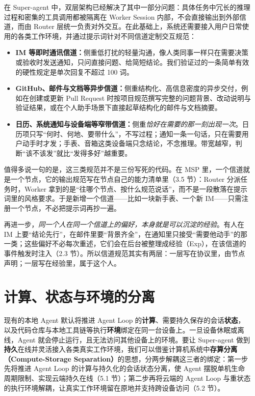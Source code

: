 \documentclass[11pt,a4paper,UTF8,fontset=windows]{ctexart}
\begin{document}
在 Super-agent 中，双层架构已经解决了其中一部分问题：具体任务中冗长的推理过程和密集的工具调用都被隔离在 Worker Session 内部，不会直接输出到外部信道，而由 Router 层统一负责对外交互。在此基础上，系统还需要接入用户日常使用的各类工作环境，并通过提示词针对不同信道定制交互规范：

\begin{itemize}
  \item \textbf{IM 等即时通讯信道：}侧重低打扰的轻量沟通，像人类同事一样只在需要决策或验收时发送通知，只问直接问题、给简短结论。我们验证过的一条简单有效的硬性规定是单次回复不超过 100 词。
  \item \textbf{GitHub、邮件与文档等异步信道：}侧重结构化、高信息密度的异步交付，例如在创建或更新 Pull Request 时按项目规范撰写完整的问题背景、改动说明与验证结果，或在个人助手场景下直接起草结构化的邮件与文档摘要。
  \item \textbf{日历、系统通知与设备端等窄带信道：}侧重\emph{恰好在需要的那一刻出现一次}。日历项只写“何时、何地、要带什么”，不写过程；通知一条一句话，只在需要用户动手时才发；手表、音箱这类设备端只念结论，不念推理。带宽越窄，判断“该不该发”就比“发得多好”越重要。
\end{itemize}

值得多说一句的是，这三类规范并不是三份写死的代码。在 MSP 里，一个信道就是一个节点，它的输出规范写在节点自己的能力清单里（3.5 节）：Router 分派任务时，Worker 拿到的是“往哪个节点、按什么规范说话”，而不是一段散落在提示词里的风格要求。于是新增一个信道——比如一块新手表、一个新 IM——只需注册一个节点，不必把提示词再抄一遍。

再进一步，\emph{同一个人在同一个信道上的偏好，本身就是可以沉淀的经验}。有人在 IM 上要“结论先行”，在邮件里要“背景齐全”，在通知里只接受“需要他动手”的那一类；这些偏好不必每次重述，它们会在后台被整理成经验（Exp），在该信道的事件触发时注入（2.3 节）。所以信道规范其实有两层：一层写在协议里，由节点声明；一层写在经验里，属于这个人。

\section{计算、状态与环境的分离}

现有的本地 Agent 默认将推进 Agent Loop 的\textbf{计算}、需要持久保存的会话\textbf{状态}，以及代码仓库与本地工具链等执行\textbf{环境}绑定在同一台设备上。一旦设备休眠或离线，Agent 就会停止运行，且无法访问其他设备上的环境。要让 Super-agent 做到\textbf{持久}在线并灵活接入各类真实工作环境，我们可以借鉴计算机系统中\textbf{存算分离（Compute-Storage Separation）}的思想，分两步解耦这三者的绑定：第一步先将推进 Agent Loop 的计算与持久化的会话状态分离，使 Agent 摆脱单机生命周期限制、实现云端持久在线（5.1 节）；第二步再将云端的 Agent Loop 与重状态的执行环境解耦，让真实工作环境留在原地并支持跨设备访问（5.2 节）。
\end{document}
